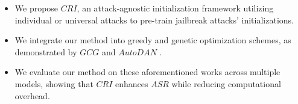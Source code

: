 
\begin{itemize}
    \item We propose $CRI$, an attack-agnostic initialization framework utilizing individual or universal attacks to pre-train jailbreak attacks' initializations.
    \item We integrate our method into greedy and genetic optimization schemes, as demonstrated by $GCG$ \cite{zou2023universal} and $AutoDAN$ \cite{liu2023autodan}.
    \item We evaluate our method on these aforementioned works across multiple models, showing that $CRI$ enhances $ASR$ while reducing computational overhead.
\end{itemize}  

